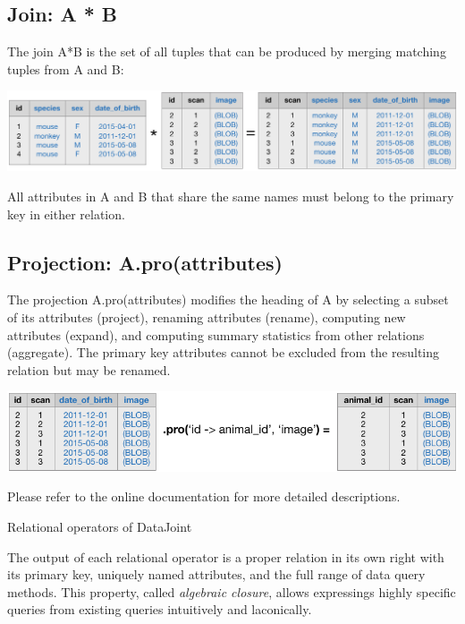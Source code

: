 \documentclass[10pt,letterpaper]{article}
\begin{document}
\begin{table}
\begin{boxedminipage}{\textwidth}
\subsection*{Join: {\sf A * B}}
The join {\sf A*B} is the set of all tuples that can be produced by merging matching tuples from {\sf A} and {\sf B}:

\begin{center}
\includegraphics{./figures/join.pdf}
\end{center}
All attributes in {\sf A} and {\sf B} that share the same names must belong to the primary key in either relation.

\subsection*{Projection: {\sf A.pro(attributes)}}
The projection {\sf A.pro(attributes)} modifies the heading of {\sf A} by selecting a subset of its attributes (project), renaming attributes (rename), computing new attributes (expand), and computing summary statistics from other relations (aggregate).
The primary key attributes cannot be excluded from the resulting relation but may be renamed. 

\begin{center}
\includegraphics{./figures/project.pdf}
\end{center}

Please refer to the online documentation for more detailed descriptions.
\end{boxedminipage}
\caption{Relational operators of DataJoint}
\label{algebra}
\end{table}

The output of each relational operator is a proper relation in its own right with its primary key, uniquely named attributes, and the full range of data query methods.
This property, called \emph{algebraic closure}, allows expressings highly specific queries from existing queries intuitively and laconically.
\end{document}
